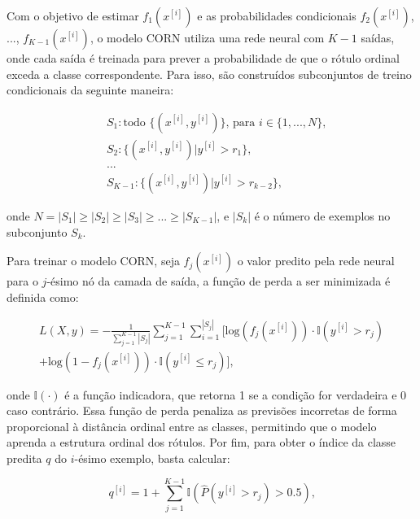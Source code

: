 Com o objetivo de estimar $f_1 (x^{[i]})$ e as probabilidades condicionais $f_2 (x^{[i]})$, ..., $f_{K-1} (x^{[i]})$, o modelo CORN utiliza uma rede neural com $K-1$ saídas, onde cada saída é treinada para prever a probabilidade de que o rótulo ordinal exceda a classe correspondente. Para isso, são construídos subconjuntos de treino condicionais da seguinte maneira:

\begin{equation}
    \begin{split}
        &S_1: \text{todo } \lbrace (x^{[i]}, y^{[i]}) \rbrace \text{, para } i \in \lbrace 1,...,N \rbrace \text{,}\\
        &S_2: \lbrace (x^{[i]}, y^{[i]}) | y^{[i]} > r_1 \rbrace \text{,}\\
        &...\\
        &S_{K-1}: \lbrace (x^{[i]}, y^{[i]}) | y^{[i]} > r_{k-2} \rbrace \text{,}
    \end{split}
\end{equation}

onde $N = |S_1| \ge |S_2| \geq |S_3| \geq ... \geq |S_{K-1}|$, e $|S_k|$ é o número de exemplos no subconjunto $S_k$.

Para treinar o modelo CORN, seja $f_j (x^{[i]})$ o valor predito pela rede neural para o $j$-ésimo nó da camada de saída, a função de perda a ser minimizada é definida como:

\begin{equation}
    \begin{split}
        L(X,y) = -\frac{1}{\sum_{j=1}^{K-1} |S_j|} \sum_{j=1}^{K-1} \sum_{i=1}^{|S_j|} [\text{log}(f_j (x^{[i]})) \cdot \mathbb{I}(y^{[i]} > r_j) \\
        +\text{log}(1 - f_j (x^{[i]})) \cdot \mathbb{I}(y^{[i]} \leq r_j)] \text{,}
    \end{split}
\end{equation}

onde $\mathbb{I}(\cdot)$ é a função indicadora, que retorna 1 se a condição for verdadeira e 0 caso contrário. Essa função de perda penaliza as previsões incorretas de forma proporcional à distância ordinal entre as classes, permitindo que o modelo aprenda a estrutura ordinal dos rótulos. Por fim, para obter o índice da classe predita $q$ do $i$-ésimo exemplo, basta calcular:

\begin{equation}
    q^{[i]} = 1 + \sum_{j=1}^{K-1} \mathbb{I}(\hat{P}(y^{[i]} > r_j) > 0.5) \text{,}
\end{equation}

